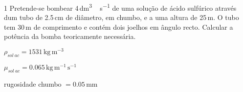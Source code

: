 \documentclass[\mainfilename]{subfiles}
\begin{document}
\begin{questionBox}1{ %
    Pretende-se bombear 4\,\unit{\deci\metre^3\,\second^{-1}} de uma solução de ácido sulfúrico através dum tubo de 2.5\,\unit{\centi\metre} de diâmetro, em chumbo, e a uma altura de 25\,\unit{\metre}. O tubo tem 30\,\unit{\metre} de comprimento e contém dois joelhos em ângulo recto. Calcular a potência da bomba teoricamente necessária.
} %
    
    \begin{itemize}
        \begin{multicols}{2}
            \item \( \rho_{sol\ ac}=1531\,\unit{\kilo\gram\,\metre^{-3}}\)
            \item \( \mu_{sol\ ac} = 0.065\,\unit{\kilo\gram\,\metre^{-1}\,\second^{-1}}\)
            \item rugosidade chumbo \(= 0.05\,\unit{\milli\metre}\)
        \end{multicols}
    \end{itemize}


\end{questionBox}
\end{document}

